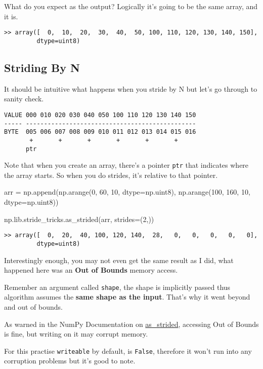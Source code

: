 \documentclass[oneside, 12pt]{report}
\begin{document}
What do you expect as the output? Logically it's going to be the same array, and it is.

\begin{verbatim}
>> array([  0,  10,  20,  30,  40,  50, 100, 110, 120, 130, 140, 150],
     	 dtype=uint8)
\end{verbatim}

\subsection{Striding By N}

It should be intuitive what happens when you stride by N but let's go through to sanity check.

\begin{verbatim}
VALUE 000 010 020 030 040 050 100 110 120 130 140 150
----- ----------------------------------------------- 
BYTE  005 006 007 008 009 010 011 012 013 014 015 016
       +       +       +       +       +       +
      ptr
\end{verbatim}

Note that when you create an array, there's a pointer \verb+ptr+ that indicates where the array starts. So when you do strides, it's relative to that pointer.

\begin{python}
arr = np.append(np.arange(0, 60, 10, dtype=np.uint8),
                np.arange(100, 160, 10, dtype=np.uint8))

np.lib.stride_tricks.as_strided(arr, strides=(2,))
\end{python}

\begin{verbatim}
>> array([  0,  20,  40, 100, 120, 140,  28,   0,   0,   0,   0,   0],
   	     dtype=uint8)
\end{verbatim}

Interestingly enough, you may not even get the same result as I did, what happened here was an \textbf{Out of Bounds} memory access.

Remember an argument called \verb+shape+, the shape is implicitly passed thus algorithm assumes the \textbf{same shape as the input}. That's why it went beyond and out of bounds.

As warned in the NumPy Documentation on \href{https://docs.scipy.org/doc/numpy-1.15.1/reference/generated/numpy.lib.stride_tricks.as_strided.html}{as\_strided}, accessing Out of Bounds is fine, but writing on it may corrupt memory.

For this practise \verb+writeable+ by default, is \verb+False+, therefore it won't run into any corruption problems but it's good to note.
\end{document}
